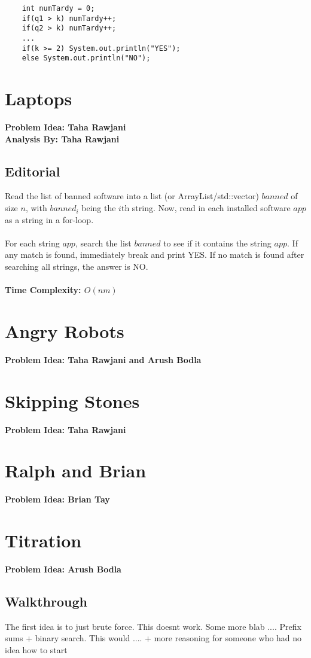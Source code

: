 \documentclass{article}
\begin{document}
\begin{lstlisting}
    int numTardy = 0;
    if(q1 > k) numTardy++;
    if(q2 > k) numTardy++;
    ...
    if(k >= 2) System.out.println("YES");
    else System.out.println("NO");
\end{lstlisting}

\section{Laptops}
\textbf{Problem Idea: Taha Rawjani\\ Analysis By: Taha Rawjani}
\subsection{Editorial}
Read the list of banned software into a list (or ArrayList/std::vector) $banned$ of size $n$, with $banned_i$ being the $i$th string. Now, read in each installed software $app$ as a string in a for-loop. \\\\
For each string $app$, search the list $banned$ to see if it contains the string $app$. If any match is found, immediately break and print YES. If no match is found after searching all strings, the answer is NO.
\\\\
\textbf{Time Complexity: $O(nm)$}

\section{Angry Robots}
\textbf{Problem Idea: Taha Rawjani and Arush Bodla}
\section{Skipping Stones}
\textbf{Problem Idea: Taha Rawjani}
\section{Ralph and Brian}
\textbf{Problem Idea: Brian Tay}
\section{Titration}
\textbf{Problem Idea: Arush Bodla}
\subsection{Walkthrough}
The first idea is to just brute force. This doesnt work. Some more blab .... Prefix sums + binary search. This would .... + more reasoning for someone who had no idea how to start
\end{document}

